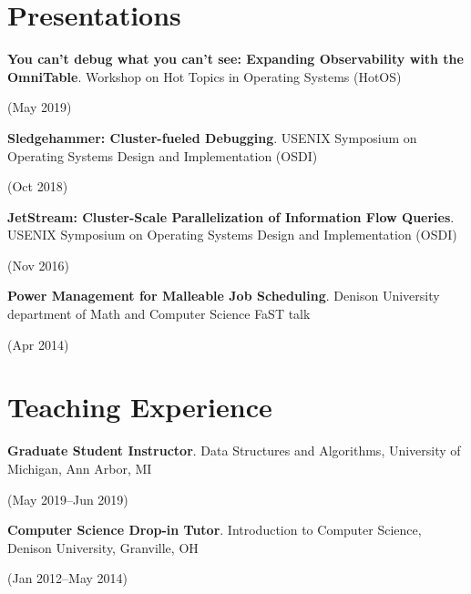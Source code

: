 \documentclass[letterpaper,10pt]{article}
\newcommand{\sidebyside}[2]{
  \begin{minipage}[t]{.75\textwidth}
    \raggedright{}
    #2
  \end{minipage}
  \hspace{.01\textwidth}
    \begin{minipage}[t]{.205\textwidth}
    \raggedleft
    #1
  \end{minipage}
}
\newcommand{\trio}[3]{\sidebyside{#3}{\textbf{#1}. #2}}
\begin{document}
\section{Presentations}
\begin{smenumerate}
\item\trio{You can't debug what you can't see: Expanding Observability with the
  OmniTable}{Workshop on Hot Topics in Operating Systems (HotOS)}{(May 2019)}

\item\trio{Sledgehammer: Cluster-fueled Debugging}{USENIX Symposium on Operating
  Systems Design and Implementation (OSDI)}{(Oct 2018)}

\item\trio{JetStream: Cluster-Scale Parallelization of Information Flow
  Queries}{USENIX Symposium on Operating Systems Design and Implementation
  (OSDI)}{(Nov 2016)}

\item\trio{Power Management for Malleable Job Scheduling}{Denison University
  department of Math and Computer Science FaST talk}{(Apr 2014)}
\end{smenumerate}

\section{Teaching Experience}
\begin{smenumerate}
\item\trio{Graduate Student Instructor}{Data Structures and Algorithms,
  University of Michigan, Ann Arbor, MI}{(May 2019--Jun 2019)}

\item\trio{Computer Science Drop-in Tutor}{Introduction to Computer Science,
  Denison University, Granville, OH}{(Jan 2012--May 2014)}
\end{smenumerate}

\end{document}
